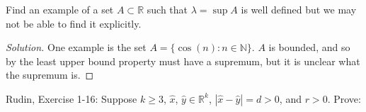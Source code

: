 \documentclass{article}
\newcommand{\R}{\mathbb{R}}
\newcommand{\N}{\mathbb{N}}
\newcommand{\abs}[1]{\left| #1 \right|}
\newenvironment{problem}[2][Problem]{\begin{trivlist}
\item[\hskip \labelsep {\bfseries #1}\hskip \labelsep {\bfseries #2.}]}{\end{trivlist}}
\newenvironment{solution}{\begin{proof}[Solution]}{\end{proof}}
\begin{document}

\begin{problem}{2}
    Find an example of a set $A \subset \R$ such that $\lambda = \sup A$ is well defined but we may not be able to find it explicitly.
\end{problem}

\begin{solution}
    One example is the set $A = \{\cos(n) : n \in \N\}$. $A$ is bounded, and so by the least upper bound property must have a supremum, but it is unclear what the supremum is.
\end{solution}


\begin{problem}{3}
    Rudin, Exercise 1-16: Suppose $k \ge 3$, $\hat x$, $\hat y \in \R^k$, $\abs{\hat x - \hat y} = d > 0$, and $r > 0$. Prove: 
\end{problem}
\end{document}

